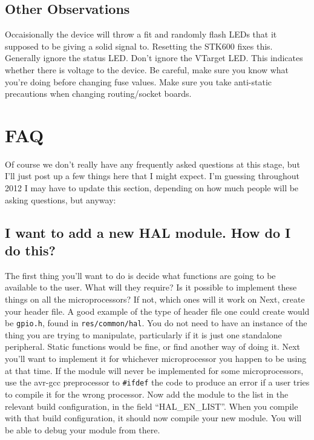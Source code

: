 \documentclass[a4paper, oneside, 11pt, titlepage, onecolumn, openright]{report}
\begin{document}
{\section{Other Observations}
			\label{s:STK600OtherObservations}			 
			 Occaisionally the device will throw a fit and randomly flash LEDs that it supposed to be giving a solid signal to. Resetting the STK600 fixes this. \newline
			 Generally ignore the status LED.\newline
			 Don't ignore the VTarget LED. This indicates whether there is voltage to the device.\newline
			 Be careful, make sure you know what you're doing before changing fuse values.\newline
			 Make sure you take anti-static precautions when changing routing/socket boards.
			 
\chapter{FAQ}
			\label{C:FAQ}
			Of course we don't really have any frequently asked questions at this stage, but I'll just post up a few things here that I might expect. I'm guessing throughout 2012 I may have to update this section, depending on how much people will be asking questions, but anyway:
			
\section{I want to add a new HAL module. How do I do this?}
			\label{s:FAQNewHAL}
			The first thing you'll want to do is decide what functions are going to be available to the user. What will they require? Is it possible to implement these things on all the microprocessors? If not, which ones will it work on\newline
			Next, create your header file. A good example of the type of header file one could create would be \texttt{gpio.h}, found in \texttt{res/common/hal}. You do not need to have an instance of the thing you are trying to manipulate, particularly if it is just one standalone peripheral. Static functions would be fine, or find another way of doing it.\newline
			Next you'll want to implement it for whichever microprocessor you happen to be using at that time. If the module will never be implemented for some microprocessors, use the avr-gcc preprocessor to \texttt{\#ifdef} the code to produce an error if a user tries to compile it for the wrong processor.\newline
			Now add the module to the list in the relevant build configuration, in the field ``HAL\_EN\_LIST''. When you compile with that build configuration, it should now compile your new module. You will be able to debug your module from there.
			
}
\end{document}
